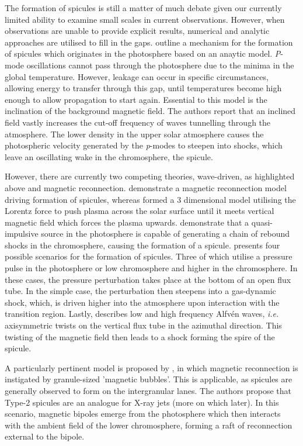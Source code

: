 The formation of spicules is still a matter of much debate given our currently limited ability to examine small scales in current observations. 
However, when observations are unable to provide explicit results, numerical and analytic approaches are utilised to fill in the gaps.
\cite{DePointeu2004} outline a mechanism for the formation of spicules which originates in the photosphere based on an anaytic model.
\emph{P}-mode oscillations cannot pass through the photosphere due to the minima in the global temperature.
However, leakage can occur in specific circumstances, allowing energy to transfer through this gap, until temperatures become high enough to allow propagation to start again.
Essential to this model is the inclination of the background magnetic field.
The authors report that an inclined field vastly increases the cut-off frequency of waves tunnelling through the atmosphere. 
The lower density in the upper solar atmosphere causes the photospheric velocity generated by the \emph{p}-modes to steepen into shocks, which leave an oscillating wake in the chromosphere, the spicule.

However, there are currently two competing theories, wave-driven, as highlighted above and magnetic reconnection.
\cite{Takeuchi2001} demonstrate a magnetic reconnection model driving formation of spicules, whereas \cite{Martinez2011} formed a $3$ dimensional model utilising the Lorentz force to push plasma across the solar surface until it meets vertical magnetic field which forces the plasma upwards.
\cite{Hollweg1982} demonstrate that a quasi-impulsive source in the photosphere is capable of generating a chain of rebound shocks in the chromosphere, causing the formation of a spicule.
\cite{Sterling2000} presents four possible scenarios for the formation of spicules.
Three of which utilise a pressure pulse in the photosphere or low chromosphere and higher in the chromosphere. 
In these cases, the pressure perturbation takes place at the bottom of an open flux tube.
In the simple case, the perturbation then steepens into a gas-dynamic shock, which, is driven higher into the atmosphere upon interaction with the transition region.
Lastly, \cite{Sterling2000} describes low and high frequency Alfv{\'e}n waves, \emph{i.e.} axisymmetric twists on the vertical flux tube in the azimuthal direction.
This twisting of the magnetic field then leads to a shock forming the spire of the spicule.

A particularly pertinent model is proposed by \cite{Moore2011spic_recon}, in which magnetic reconnection is instigated by granule-sized 'magnetic bubbles'.
This is applicable, as spicules are generally observed to form on the intergranular lanes.
The authors propose that Type-2 spicules are an analogue for X-ray jets (more on which later).
In this scenario, magnetic bipoles emerge from the photosphere which then interacts with the ambient field of the lower chromosphere, forming a raft of reconnection external to the bipole. 

